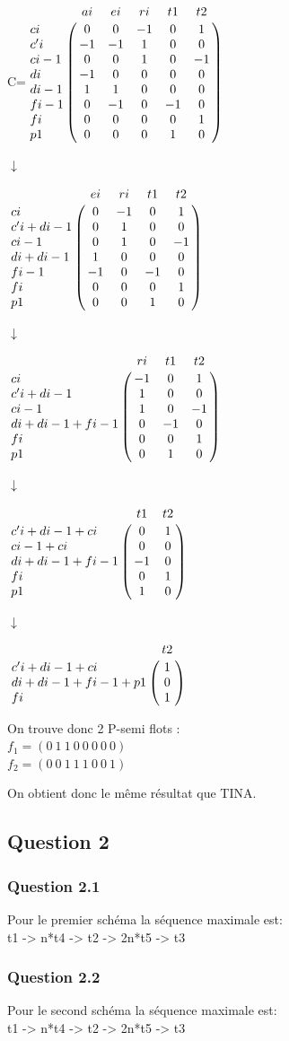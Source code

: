\begin{center}


{\Huge C}\qquad =\qquad $\bordermatrix{
&ai&ei&ri&t1&t2\cr
ci&0&0&-1&0&1\cr
c'i&-1&-1&1&0&0\cr
ci-1&0&0&1&0&-1\cr
di&-1&0&0&0&0\cr
di-1&1&1&0&0&0\cr
fi-1&0&-1&0&-1&0\cr
fi&0&0&0&0&1\cr
p1&0&0&0&1&0\cr
}$

{\Huge $\downarrow$}

$\bordermatrix{
&ei&ri&t1&t2\cr
ci&0&-1&0&1\cr
c'i+di-1&0&1&0&0\cr
ci-1&0&1&0&-1\cr
di+di-1&1&0&0&0\cr
fi-1&-1&0&-1&0\cr
fi&0&0&0&1\cr
p1&0&0&1&0\cr
}$

{\Huge $\downarrow$}

$\bordermatrix{
&ri&t1&t2\cr
ci&-1&0&1\cr
c'i+di-1&1&0&0\cr
ci-1&1&0&-1\cr
di+di-1+fi-1&0&-1&0\cr
fi&0&0&1\cr
p1&0&1&0\cr
}$

{\Huge $\downarrow$}

$\bordermatrix{
&t1&t2\cr
c'i+di-1+ci&0&1\cr
ci-1+ci&0&0\cr
di+di-1+fi-1&-1&0\cr
fi&0&1\cr
p1&1&0\cr
}$

{\Huge $\downarrow$}

$\bordermatrix{
&t2\cr
c'i+di-1+ci&1\cr
di+di-1+fi-1+p1&0\cr
fi&1\cr
}$

\vspace{1cm}

On trouve donc 2 P-semi flots :\\
$f_1 = (0\ 1\ 1\ 0\ 0\ 0\ 0\ 0)$\\
$f_2 = (0\ 0\ 1\ 1\ 1\ 0\ 0\ 1)$\\

\end{center}

On obtient donc le même résultat que TINA.


\subsection{Question 2}
\subsubsection{Question 2.1}
Pour le premier schéma la séquence maximale est:\\
t1 -> n*t4 -> t2 -> 2n*t5 -> t3 

\subsubsection{Question 2.2}
Pour le second schéma la séquence maximale est:\\
t1 -> n*t4 -> t2 -> 2n*t5 -> t3 
